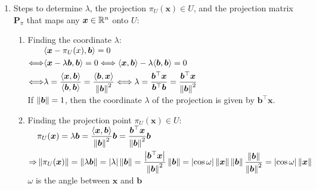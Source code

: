\begin{enumerate}
    \item Steps to determine $\lambda$, the projection $\pi _U (\bm{x}) \in  U$, and the projection matrix $\bm{P}_ \pi $ that maps any $\bm{x} \in  \mathbb{R}^n$ onto $U$:
    \hfill \cite{mfml/book/mml/Deisenroth-Faisal-Ong}
    \begin{enumerate}
        \item Finding the coordinate $\lambda $:
        \hfill \cite{mfml/book/mml/Deisenroth-Faisal-Ong}
        \\
        $
            \begin{aligned}
                & \langle\bm{x} - \pi_ U (x), \bm{b}\rangle = 0 
                \\
                \Longleftrightarrow &
                    \langle\bm{x} - \lambda \bm{b}, \bm{b}\rangle = 0
                    \Longleftrightarrow 
                    \langle\bm{x}, \bm{b}\rangle - \lambda  \langle\bm{b}, \bm{b}\rangle = 0 
                \\
                \Longleftrightarrow &
                    \lambda  
                    = \dfrac{\langle\bm{x}, \bm{b}\rangle}{\langle\bm{b}, \bm{b}\rangle} 
                    = \dfrac{\langle\bm{b}, \bm{x}\rangle}{\left\| \bm{b} \right\|^2}
                    \Longleftrightarrow 
                    \lambda 
                    =\dfrac{\bm{b}^\top \bm{x}}{\bm{b}^\top \bm{b}}
                    =\dfrac{\bm{b}^\top \bm{x}}{\left\| \bm{b} \right\|^2}
            \end{aligned}
        $
        \hfill \cite{mfml/book/mml/Deisenroth-Faisal-Ong}
        \\
        If $\left\| \bm{b} \right\| = 1$, then the coordinate $\lambda$ of the projection is given by $\bm{b}^\top \bm{x}$.
        \hfill \cite{mfml/book/mml/Deisenroth-Faisal-Ong}

        \item Finding the projection point $\pi_U (\bm{x}) \in U$:
        \hfill \cite{mfml/book/mml/Deisenroth-Faisal-Ong}
        \\
        $
            \begin{aligned}
                & \pi _U (\bm{x}) = \lambda  \bm{b} 
                    = \dfrac{\langle\bm{x}, \bm{b}\rangle}{\left\| \bm{b} \right\|^2} \bm{b} 
                    = \dfrac{\bm{b}^\top \bm{x}}{\left\| \bm{b} \right\|^2} \bm{b} 
                \\
                \Rightarrow &
                    \left\| \pi _U (\bm{x}) \right\| = \left\| \lambda  \bm{b} \right\| = \left| \lambda \right| \left\| \bm{b} \right\| 
                    = \dfrac{\left| \bm{b}^\top \bm{x} \right|}{\left\| \bm{b} \right\|^2} \left\| \bm{b} \right\|
                    = \left| \cos \omega \right| \left\| \bm{x} \right\| \left\| \bm{b} \right\| \dfrac{\left\| \bm{b} \right\|}{\left\| \bm{b} \right\|^2}
                    = \left| \cos \omega \right| \left\| \bm{x} \right\| 
            \end{aligned}
        $
        \\
        $\omega$ is the angle between $\bm{x}$ and $\bm{b}$
        \hfill \cite{mfml/book/mml/Deisenroth-Faisal-Ong}


\end{enumerate}
\end{enumerate}
